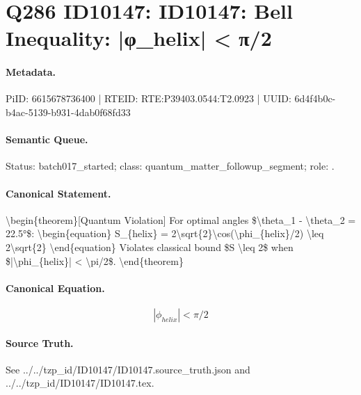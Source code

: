 \section*{Q286 ID10147: ID10147: Bell Inequality: |φ\_helix| < π/2}
\paragraph{Metadata.}
PiID: 6615678736400 | RTEID: RTE:P39403.0544:T2.0923 | UUID: 6d4f4b0c-b4ac-5139-b931-4dab0f68fd33

\paragraph{Semantic Queue.}
Status: batch017\_started; class: quantum\_matter\_followup\_segment; role: .

\paragraph{Canonical Statement.}
\textbackslash{}begin\{theorem\}[Quantum Violation] For optimal angles \$\textbackslash{}theta\_1 - \textbackslash{}theta\_2 = 22.5°\$: \textbackslash{}begin\{equation\} S\_\{helix\} = 2\textbackslash{}sqrt\{2\}\textbackslash{}cos(\textbackslash{}phi\_\{helix\}/2) \textbackslash{}leq 2\textbackslash{}sqrt\{2\} \textbackslash{}end\{equation\} Violates classical bound \$S \textbackslash{}leq 2\$ when \$|\textbackslash{}phi\_\{helix\}| < \textbackslash{}pi/2\$. \textbackslash{}end\{theorem\}

\paragraph{Canonical Equation.}
\[
|\phi_{helix}| < \pi/2
\]

\paragraph{Source Truth.}
See ../../tzp\_id/ID10147/ID10147.source\_truth.json and ../../tzp\_id/ID10147/ID10147.tex.
